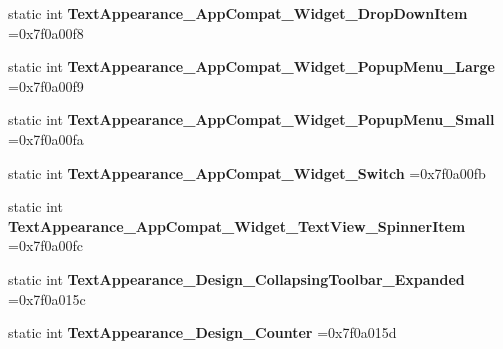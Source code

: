 \begin{DoxyCompactItemize}
\item 
\mbox{\label{classandroid_1_1support_1_1design_1_1R_1_1style_af9f47ee8013547adacf95bc980eba665}} 
static int {\bfseries Text\+Appearance\+\_\+\+App\+Compat\+\_\+\+Widget\+\_\+\+Drop\+Down\+Item} =0x7f0a00f8
\item 
\mbox{\label{classandroid_1_1support_1_1design_1_1R_1_1style_a41ef2e7546a1aab0437d14131c0242be}} 
static int {\bfseries Text\+Appearance\+\_\+\+App\+Compat\+\_\+\+Widget\+\_\+\+Popup\+Menu\+\_\+\+Large} =0x7f0a00f9
\item 
\mbox{\label{classandroid_1_1support_1_1design_1_1R_1_1style_a1bca003fea9580273ef9d3d157ccf3e9}} 
static int {\bfseries Text\+Appearance\+\_\+\+App\+Compat\+\_\+\+Widget\+\_\+\+Popup\+Menu\+\_\+\+Small} =0x7f0a00fa
\item 
\mbox{\label{classandroid_1_1support_1_1design_1_1R_1_1style_a6a81f9bef7ea728992cd64705873182e}} 
static int {\bfseries Text\+Appearance\+\_\+\+App\+Compat\+\_\+\+Widget\+\_\+\+Switch} =0x7f0a00fb
\item 
\mbox{\label{classandroid_1_1support_1_1design_1_1R_1_1style_a935166fd0e49e84849fbe42fa8fd39ff}} 
static int {\bfseries Text\+Appearance\+\_\+\+App\+Compat\+\_\+\+Widget\+\_\+\+Text\+View\+\_\+\+Spinner\+Item} =0x7f0a00fc
\item 
\mbox{\label{classandroid_1_1support_1_1design_1_1R_1_1style_a7d7f436ffb3c2c696eef2cd0ecb73110}} 
static int {\bfseries Text\+Appearance\+\_\+\+Design\+\_\+\+Collapsing\+Toolbar\+\_\+\+Expanded} =0x7f0a015c
\item 
\mbox{\label{classandroid_1_1support_1_1design_1_1R_1_1style_af7aafd367418caaa3ba5cba223564128}} 
static int {\bfseries Text\+Appearance\+\_\+\+Design\+\_\+\+Counter} =0x7f0a015d
\item 
\mbox{\label{classandroid_1_1support_1_1design_1_1R_1_1style_a7f28aa14116d10323544d79b0f657504}} 

\end{DoxyCompactItemize}
